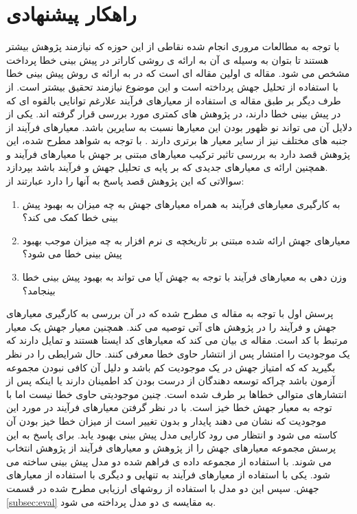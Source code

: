 \section{راهکار پیشنهادی}
\label{sec:method}
با توجه به مطالعات مروری انجام شده نقاطی از این حوزه که نیازمند پژوهش بیشتر هستند تا بتوان به وسیله ی آن به ارائه ی روشی کاراتر در پیش بینی خطا پرداخت مشخص می شود. مقاله ی \cite{bowes2016mutation} اولین مقاله ای است که در به ارائه ی روش پیش بینی خطا با استفاده از تحلیل جهش پرداخته است و این موضوع نیازمند تحقیق بیشتر است. از طرف دیگر بر طبق مقاله ی \cite{radjenovic2013software} استفاده از معیارهای فرآیند علارغم توانایی بالقوه ای که در پیش بینی خطا دارند، در پژوهش های کمتری مورد بررسی قرار گرفته اند. یکی از دلایل آن می تواند نو ظهور بودن این معیارها نسبت به سایرین باشد. معیارهای فرآیند از جنبه های مختلف نیز از سایر معیار ها برتری دارند \cite{rahman2013and}. با توجه به شواهد مطرح شده، این پژوهش قصد دارد به بررسی تاثیر ترکیب معیارهای مبتنی بر جهش با معیارهای فرآیند و همچنین ارائه ی معیارهای جدیدی که بر پایه ی تحلیل جهش و فرآیند باشد بپردازد.\\
سوالاتی که این پژوهش قصد پاسخ به آنها را دارد عبارتند از:

\begin{enumerate}
	\item  
	به کارگیری معیارهای فرآیند به همراه معیارهای جهش به چه میزان به بهبود پیش بینی خطا کمک می کند؟
	\item 
	معیارهای جهش ارائه شده مبتنی بر تاریخچه ی نرم افزار به چه میزان موجب بهبود پیش بینی خطا می شود؟
	\item 
	وزن دهی به معیارهای فرآیند با توجه به جهش آیا می تواند به بهبود پیش بینی خطا بینجامد؟  
\end{enumerate}

پرسش اول با توجه به مقاله ی \cite{bowes2016mutation} مطرح شده که در آن بررسی به کارگیری معیارهای جهش و فرآیند را در پژوهش های آتی توصیه می کند.  همچنین  معیار جهش یک معیار  مرتبط با کد است. مقاله ی \cite{rahman2013and}  بیان می کند که معیارهای کد ایستا هستند و تمایل دارند که یک موجودیت را امتشار پس از انتشار حاوی خطا معرفی کنند. حال شرایطی را در نظر بگیرید که که امتیاز جهش در یک موجودیت کم باشد و دلیل آن کافی نبودن مجموعه آزمون باشد چراکه توسعه دهندگان از درست بودن کد اطمینان دارند یا اینکه پس از انتشارهای متوالی خطاها بر طرف شده است. چنین موجودیتی حاوی خطا نیست اما با توجه به معیار جهش خطا خیز است. با در نظر گرفتن معیارهای فرآیند در مورد این موجودیت که نشان می دهند پایدار و بدون تغییر است از میزان خطا خیز بودن آن کاسته می شود و انتظار می رود کارایی مدل پیش بینی بهبود یابد. 
برای پاسخ به این پرسش مجموعه معیارهای جهش را از پژوهش \cite{bowes2016mutation}  و معیارهای فرآیند از پژوهش \cite{rahman2013and} انتخاب می شوند. با استفاده از مجموعه داده ی فراهم شده دو مدل پیش بینی ساخته می شود. یکی با استفاده از معیارهای فرآیند به تنهایی و دیگری با استفاده از معیارهای جهش. سپس این دو مدل با استفاده از روشهای ارزیابی مطرح شده در قسمت \ref{subsec:eval}  به مقایسه ی دو مدل پرداخته می شود. \\

